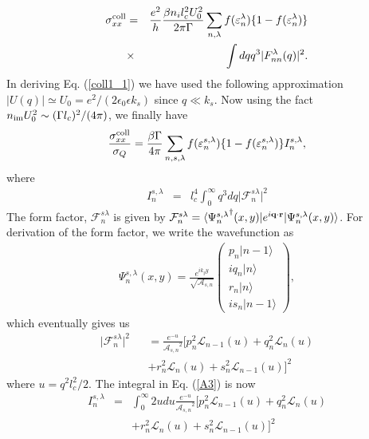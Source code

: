 \documentclass[prb,twocolumn]{revtex4-1}
\begin{document}
\begin{eqnarray}\label{coll1_1}
\sigma_{xx}^{\rm coll}&=&\frac{e^2}{h}\frac{\beta n_il_c^2U_0^2}{2\pi\Gamma}
\sum_{n,\lambda}f(\varepsilon_n^\lambda)\{1-f(\varepsilon_n^\lambda)\}\nonumber\\
&\times&\int dqq^3\vert F_{nn}^\lambda(q)\vert^2.
\end{eqnarray}
In deriving Eq. (\ref{coll1_1}) we have used the following approximation
$\vert U(q) \vert \simeq U_0=e^2/(2\epsilon_0\epsilon k_s)$ since $q\ll k_s$. Now 
using the fact $n_{\rm im} U_0^2 \sim (\Gamma l_c)^2/(4\pi)$, we finally have
\begin{eqnarray}\label{A2}
\frac{\sigma_{xx}^{\rm coll}}{\sigma_Q}=\frac{\beta \Gamma}{4\pi}
\sum_{n,s,\lambda}f(\varepsilon_n^{s,\lambda})\{1-f(\varepsilon_n^{s,\lambda})\}I_n^{s,\lambda},
\end{eqnarray}
where
\begin{eqnarray}\label{A3}
I_n^{s,\lambda}&=&l_c^4\int_0^\infty q^3dq\vert\mathcal{F}_n^{s\lambda}\vert^2
\end{eqnarray}
The form factor, $\mathcal{F}_n^{s\lambda}$ is given by $\mathcal{F}_n^{s\lambda}=\langle{\Psi_n^{s,\lambda}}^\dagger(x,y)\vert e^{i{\bf q}\cdot{\bf r}}\vert{\Psi_n^{s,\lambda}}(x,y)\rangle$. For derivation of the form factor, we write the wavefunction as
\begin{eqnarray}
\Psi_n^{s,\lambda}(x,y)=\frac{e^{ik_yy}}{\sqrt{\mathcal{A}_{s,n}}}\begin{pmatrix}
p_n\vert n-1\rangle\\
iq_n \vert n\rangle\\
r_n \vert n\rangle\\
i s_n\vert n-1\rangle 
\end{pmatrix},
\end{eqnarray}
which eventually gives us
\begin{eqnarray}
\vert \mathcal{F}_n^{s\lambda}\vert^2&&=\frac{e^{-u}}{{\mathcal{A}_{s,n}}^2}[p_n^2\mathcal{L}_{n-1}(u)+q_n^2\mathcal{L}_n(u)\nonumber\\&&+r_n^2\mathcal{L}_n(u)+s_n^2\mathcal{L}_{n-1}(u)]^2
\end{eqnarray}
where $u=q^2l_c^2/2$.
The integral in Eq. (\ref{A3}) is now
\begin{eqnarray}
I_n^{s,\lambda}&=&\int_0^\infty 2udu
\frac{e^{-u}}{{\mathcal{A}_{s,n}}^2}[p_n^2\mathcal{L}_{n-1}(u)+q_n^2\mathcal{L}_n(u)\nonumber\\&&+r_n^2\mathcal{L}_n(u)+s_n^2\mathcal{L}_{n-1}(u)]^2
\end{eqnarray}
\end{document}
